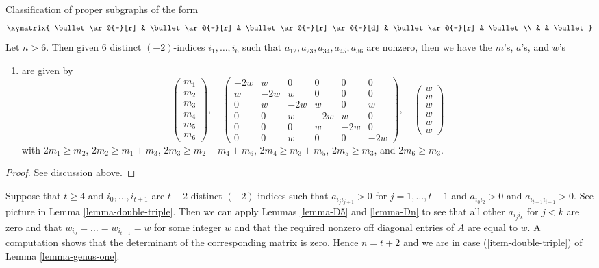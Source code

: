 \begin{lemma}
\label{lemma-E6}
Classification of proper subgraphs of the form
$$
\xymatrix{
\bullet \ar@{-}[r] & \bullet \ar@{-}[r] & \bullet \ar@{-}[r] \ar@{-}[d] &
\bullet \ar@{-}[r] & \bullet \\
& & \bullet
}
$$
Let $n > 6$. Then given $6$ distinct $(-2)$-indices $i_1, \ldots, i_6$
such that $a_{12}, a_{23}, a_{34}, a_{45}, a_{36}$ are nonzero, then
we have the $m$'s, $a$'s, and $w$'s
\begin{enumerate}
\item
\label{item-E6}
are given by
$$
\left(
\begin{matrix}
m_1 \\
m_2 \\
m_3 \\
m_4 \\
m_5 \\
m_6
\end{matrix}
\right),
\quad
\left(
\begin{matrix}
-2w & w & 0 & 0 & 0 & 0 \\
w & -2w & w & 0 & 0 & 0 \\
0 & w & -2w & w & 0 & w \\
0 & 0 & w & -2w & w & 0 \\
0 & 0 & 0 & w & -2w & 0 \\
0 & 0 & w & 0 & 0 & -2w
\end{matrix}
\right),
\quad
\left(
\begin{matrix}
w \\
w \\
w \\
w \\
w \\
w
\end{matrix}
\right)
$$
with $2m_1 \geq m_2$, $2m_2 \geq m_1 + m_3$, $2m_3 \geq m_2 + m_4 + m_6$,
$2m_4 \geq m_3 + m_5$, $2m_5 \geq m_3$, and $2m_6 \geq m_3$.
\end{enumerate}
\end{lemma}

\begin{proof}
See discussion above.
\end{proof}

\noindent
Suppose that $t \geq 4$ and $i_0, \ldots, i_{t + 1}$ are
$t + 2$ distinct $(-2)$-indices such that
$a_{i_ji_{j + 1}} > 0$ for $j = 1, \ldots, t - 1$
and $a_{i_0i_2} > 0$ and $a_{i_{t - 1}i_{t + 1}} > 0$.
See picture in Lemma \ref{lemma-double-triple}.
Then we can apply Lemmas \ref{lemma-D5} and \ref{lemma-Dn}
to see that all other $a_{i_ji_k}$ for $j < k$ are zero
and that $w_{i_0} = \ldots = w_{i_{t + 1}} = w$ for some
integer $w$ and that the required nonzero off diagonal
entries of $A$ are equal to $w$.
A computation shows that the determinant of the
corresponding matrix is zero. Hence $n = t + 2$
and we are in case (\ref{item-double-triple}) of
Lemma \ref{lemma-genus-one}.

